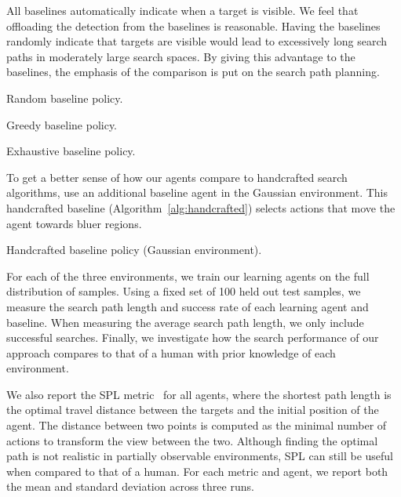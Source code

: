 All baselines automatically indicate when a target is visible.
We feel that offloading the detection from the baselines is reasonable.
Having the baselines randomly indicate that targets are visible would lead to excessively long search paths in moderately large search spaces.
By giving this advantage to the baselines, the emphasis of the comparison is put on the search path planning.

\begin{algorithm}
    \caption{Random baseline policy.}
    \label{alg:random}
    
\end{algorithm}

\begin{algorithm}
    \caption{Greedy baseline policy.}
    \label{alg:greedy}
    
\end{algorithm}

\begin{algorithm}
    \caption{Exhaustive baseline policy.}
    \label{alg:exhaustive}
    
\end{algorithm}

To get a better sense of how our agents compare to handcrafted search algorithms, use an additional baseline agent in the Gaussian environment.
This handcrafted baseline (Algorithm~\ref{alg:handcrafted}) selects actions that move the agent towards bluer regions.

\begin{algorithm}
    \caption{Handcrafted baseline policy (Gaussian environment).}
    \label{alg:handcrafted}
    
\end{algorithm}

For each of the three environments, we train our learning agents on the full distribution of samples.
Using a fixed set of 100 held out test samples, we measure the search path length and success rate of each learning agent and baseline.
When measuring the average search path length, we only include successful searches.
Finally, we investigate how the search performance of our approach compares to that of a human with prior knowledge of each environment.

We also report the SPL metric~\cite{anderson_evaluation_2018} for all agents, where the shortest path length is the optimal travel distance between the targets and the initial position of the agent.
The distance between two points is computed as the minimal number of actions to transform the view between the two.
Although finding the optimal path is not realistic in partially observable environments, SPL can still be useful when compared to that of a human.
For each metric and agent, we report both the mean and standard deviation across three runs.


